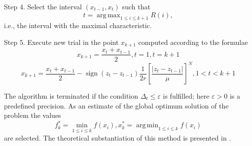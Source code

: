 \documentclass[procedia]{easychair}
\DeclareMathOperator*{\argmax}{arg\,max}
\DeclareMathOperator*{\argmin}{arg\,min}
\DeclareMathOperator{\sign}{sign}
\begin{document}
\par
Step 4. Select the interval \((x_{t-1}, x_t)\) such that
\begin{equation}
\label{step4}
t=\argmax_{1\leqslant i \leqslant k+1}R(i),
\end{equation}
i.e., the interval with the maximal characteristic.
\par
Step 5. Execute new trial in the point \(x_{k+1}\) computed according to the formulae
\begin{displaymath}
x_{k+1}=\dfrac{x_{t}+x_{t-1}}{2},t=1,t=k+1
\end{displaymath}
\begin{equation}
\label{step5}
x_{k+1}=\dfrac{x_{t}+x_{t-1}}{2}-\sign(z_{t}-z_{t-1})\dfrac{1}{2r}\left[\dfrac{|z_{t}-z_{t-1}|}{\mu}\right]^N,1<t<k+1
\end{equation}
\par
The algorithm is terminated if the condition \(\Delta_{t}\leqslant \varepsilon\) is fulfilled;
here \(\varepsilon>0\) is a predefined precision. As an estimate of the global optimum solution of the problem the values
\begin{equation}
f_k^*=\min_{1\leqslant i \leqslant k}f(x_i), x_k^*=\argmin_{1\leqslant i \leqslant k}f(x_i)
\end{equation}
are selected. The theoretical substantiation of this method is presented in \cite{strOptBook}.

\end{document}
